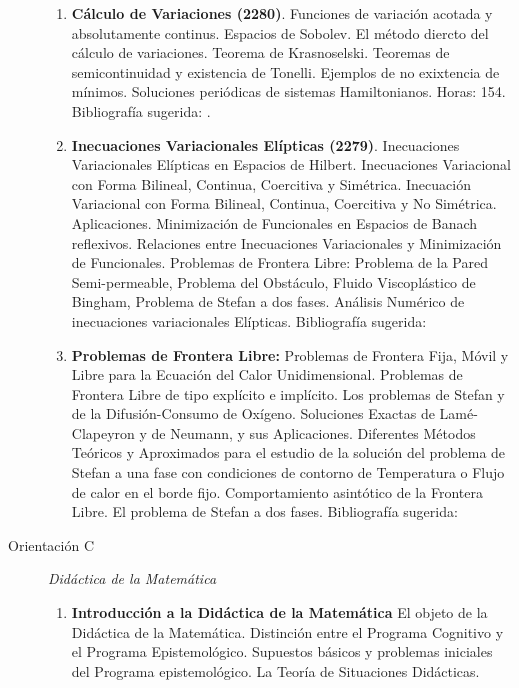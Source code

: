 \documentclass[a4paper, 12pt]{article}
\begin{document}
\begin{description}
\begin{enumerate}
\item\textbf{ Cálculo de Variaciones (2280)}. Funciones de variación acotada y absolutamente continus. Espacios de Sobolev. El método diercto del cálculo de variaciones. Teorema de Krasnoselski. Teoremas de semicontinuidad y existencia de Tonelli. Ejemplos de no exixtencia de mínimos. Soluciones periódicas de sistemas Hamiltonianos. Horas: 154. Bibliografía  sugerida: \cite{mawhin2013critical,buttazzo1998one}.

\item\textbf{Inecuaciones Variacionales Elípticas (2279)}. Inecuaciones
Variacionales E\-lípticas en Espacios de Hilbert. Inecuaciones
Variacional con Forma Bilineal, Continua, Coercitiva y Simétrica.
Inecuación Variacional con Forma Bilineal, Continua, Coercitiva y
No Simétrica. Aplicaciones. Minimización de Funcionales en
Espacios de Banach reflexivos. Relaciones entre Inecuaciones
Variacionales y Minimización de Funciona\-les. Problemas de
Frontera Libre: Problema de la Pared Semi-permea\-ble, Problema
del Obstáculo, Fluido Viscoplástico de Bingham, Problema de Stefan
a dos fases. Análisis Numérico de inecuaciones variacionales
Elípticas. Bibliografía sugerida: \cite{ekel, kinder}


 


\item\textbf{Problemas de Frontera Libre:} Problemas de Frontera Fija, Móvil
y Libre para la Ecuación del Calor Unidimensional. Problemas de
Frontera Libre de tipo explícito e implícito. Los problemas de
Stefan y de la Difusión-Consumo de Oxígeno. Soluciones Exactas de
Lamé-Clapeyron y de Neumann, y sus Aplicaciones. Diferentes
Métodos Teóricos y Aproximados para el estudio de la solución del
problema de Stefan a una fase con condiciones de contorno de
Temperatura o Flujo de calor en el borde fijo. Comportamiento
asintótico de la Frontera Libre. El problema de Stefan a dos
fases. Bibliografía  sugerida: \cite{hill,tarzia}



\end{enumerate}

\item[Orientación C]\emph{Didáctica de la Matemática}








\begin{enumerate}

\item\textbf{Introducción a la Didáctica de la Matemática}
El objeto de la Didáctica de la Matemática. Distinción entre el Programa Cognitivo y el
Programa Epistemológico. Supuestos básicos y problemas iniciales del Programa
epistemológico. La Teoría de Situaciones Didácticas. \cite{Brousseau2007,Gascón2002,Gascón1998,Sadovsky2004}





\end{enumerate}
\end{description}
\end{document}
